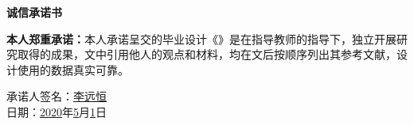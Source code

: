 %
%
%
%
%
%


\pagestyle{originality}
\topskip=0pt

\newcommand{\circled}[2][]{\tikz[baseline=(char.base)]
  {\node[shape = circle, draw, inner sep = 1pt]
  (char) {\phantom{\ifblank{#1}{#2}{#1}}};
  \node at (char.center) {\makebox[0pt][c]{#2}};}}
\robustify{\circled}

\setlength{\parskip}{0.4em}
\renewcommand{\baselinestretch}{1.41}

\vspace*{-6mm}

\begin{center}
  \songti{}\textbf{诚信承诺书}
\end{center}


\textbf{本人郑重承诺：}本人承诺呈交的毕业设计《\thesisTitle》是在指导教师的指导下，独立开展研究取得的成果，文中引用他人的观点和材料，均在文后按顺序列出其参考文献，设计使用的数据真实可靠。

\vspace{60mm}

\begin{flushright}
  承诺人签名：\underline{\hspace{1cm}李远恒\hspace{1cm}}\\
  \vspace{5mm}
  日期：\underline{\hspace{0.5cm}2020\hspace{0.5cm}}年\underline{\hspace{0.5cm}5\hspace{0.5cm}}月\underline{\hspace{0.5cm}1\hspace{0.5cm}}日
\end{flushright}

\newpage
